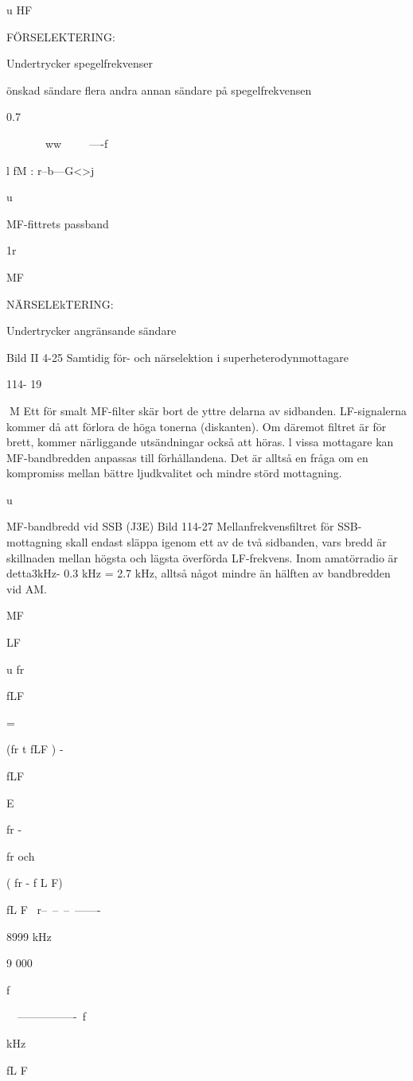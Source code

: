 \documentclass[a4paper,twoside,twocolumn,openright]{book}
\begin{document}
{{{u
HF

FÖRSELEKTERING:

Undertrycker spegelfrekvenser

önskad sändare
flera andra
annan sändare på
spegelfrekvensen

0.7

~~~~~~~ww~~~~~----f

l fM :
r--b---G<>j

u

MF-fittrets passband

1r

MF

NÄRSELEkTERING:

Undertrycker angränsande sändare

Bild II 4-25 Samtidig för- och närselektion i superheterodynmottagare

114- 19

M
Ett för smalt MF-filter skär bort de yttre
delarna av sidbanden. LF-signalerna kommer då att förlora de höga tonerna (diskanten). Om däremot filtret är för brett, kommer
närliggande utsändningar också att höras.
l vissa mottagare kan MF-bandbredden
anpassas till förhållandena. Det är alltså en
fråga om en kompromiss mellan bättre ljudkvalitet och mindre störd mottagning.

u

MF-bandbredd vid SSB (J3E)
Bild 114-27
Mellanfrekvensfiltret för SSB-mottagning
skall endast släppa igenom ett av de två
sidbanden, vars bredd är skillnaden mellan
högsta och lägsta överförda LF-frekvens.
Inom amatörradio är detta3kHz- 0.3 kHz =
2.7 kHz, alltså något mindre än hälften av
bandbredden vid AM.

MF

LF

u
fr

fLF

=

(fr t fLF ) -

fLF

E

fr -

fr och

( fr - f L F)

fL F
~r--~--~--~-------

8999
kHz

9 000

f

~~----------------~f

kHz

fL F

}}}
\end{document}
